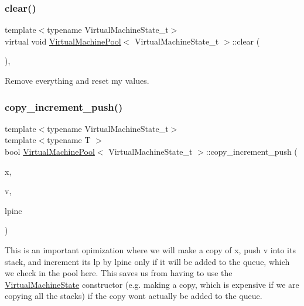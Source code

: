 \subsubsection{\texorpdfstring{clear()}{clear()}}
{\footnotesize\ttfamily template$<$typename Virtual\+Machine\+State\+\_\+t$>$ \\
virtual void \hyperlink{class_virtual_machine_pool}{Virtual\+Machine\+Pool}$<$ Virtual\+Machine\+State\+\_\+t $>$\+::clear (\begin{DoxyParamCaption}{ }\end{DoxyParamCaption})\hspace{0.3cm}{\ttfamily [inline]}, {\ttfamily [virtual]}}



Remove everything and reset my values. 

\mbox{\label{class_virtual_machine_pool_a4bf83ce58c80c72ae51c51a22a7d1e34}} 
\subsubsection{\texorpdfstring{copy\+\_\+increment\+\_\+push()}{copy\_increment\_push()}}
{\footnotesize\ttfamily template$<$typename Virtual\+Machine\+State\+\_\+t$>$ \\
template$<$typename T $>$ \\
bool \hyperlink{class_virtual_machine_pool}{Virtual\+Machine\+Pool}$<$ Virtual\+Machine\+State\+\_\+t $>$\+::copy\+\_\+increment\+\_\+push (\begin{DoxyParamCaption}\item[{const Virtual\+Machine\+State\+\_\+t $\ast$}]{x,  }\item[{T}]{v,  }\item[{double}]{lpinc }\end{DoxyParamCaption})\hspace{0.3cm}{\ttfamily [inline]}}



This is an important opimization where we will make a copy of x, push v into it\textquotesingle{}s stack, and increment its lp by lpinc only if it will be added to the queue, which we check in the pool here. This saves us from having to use the \hyperlink{class_virtual_machine_state}{Virtual\+Machine\+State} constructor (e.\+g. making a copy, which is expensive if we are copying all the stacks) if the copy won\textquotesingle{}t actually be added to the queue. 


